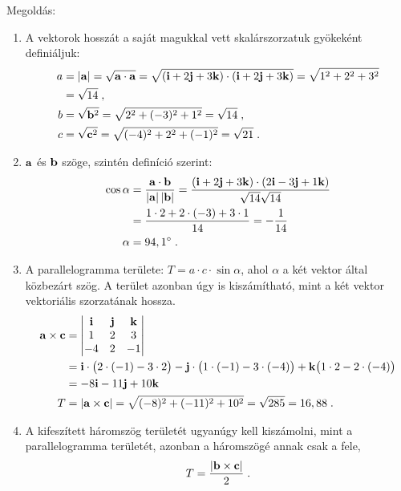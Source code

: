  Megoldás: 
 \begin{enumerate}[label=\alph*)]
  \item 
   A vektorok hosszát a saját magukkal vett skalárszorzatuk gyökeként definiáljuk:
   \begin{align}
    a
     &=\left\lvert\mathbf{a}\right\rvert
      =\sqrt{\mathbf{a}\cdot\mathbf{a}}
      =\sqrt{(\mathbf{i}+2\mathbf{j}+3\mathbf{k})\cdot(\mathbf{i}+2\mathbf{j}+3\mathbf{k})}
      =\sqrt{1^2+2^2+3^2}\nonumber
    \\
     &=\sqrt{14}\;,
    \\
    b
     &=\sqrt{\mathbf{b}^2}
      =\sqrt{2^2+(-3)^2+1^2}
      =\sqrt{14}\;,
    \\
    c
     &=\sqrt{\mathbf{c}^2}
      =\sqrt{(-4)^2+2^2+(-1)^2}
      =\sqrt{21}\;.
   \end{align}
  
  \item
   $\mathbf{a}$ és $\mathbf{b}$ szöge, szintén definíció szerint:
   \begin{align}
    \cos\alpha
     &=\frac{\mathbf{a}\cdot\mathbf{b}}{\left\lvert\mathbf{a}\right\rvert\left\lvert\mathbf{b}\right\rvert}
      =\frac{(\mathbf{i}+2\mathbf{j}+3\mathbf{k})\cdot(2\mathbf{i}-3\mathbf{j}+1\mathbf{k})}{\sqrt{14}\sqrt{14}}\nonumber
    \\
     &=\frac{1\cdot 2+2\cdot(-3)+3\cdot 1}{14}
      =-\frac{1}{14}\\
    \alpha
     &=94,1^\circ\;.
   \end{align}
   
  \item
   A parallelogramma területe: $T=a\cdot c\cdot \sin\alpha$, ahol $\alpha$ a két vektor által közbezárt szög. A terület azonban úgy is kiszámítható, mint a két vektor vektoriális szorzatának hossza.
   \begin{align}
    \mathbf{a}\times\mathbf{c}
     &=\begin{vmatrix}
        \mathbf{i} & \mathbf{j} & \mathbf{k} \\
        1 & 2 & 3 \\
        -4 & 2 & -1
       \end{vmatrix}\nonumber\\
     &=\mathbf{i}\cdot\big(2\cdot(-1)-3\cdot 2\big)-\mathbf{j}\cdot\big(1\cdot (-1)-3\cdot(-4)\big)+\mathbf{k}\big(1\cdot 2 -2\cdot(-4)\big)
      \nonumber\\
     &=-8\mathbf{i}-11\mathbf{j}+10\mathbf{k}\\
    T
     &=\left\lvert\mathbf{a}\times\mathbf{c}\right\rvert
      =\sqrt{(-8)^2+(-11)^2+10^2}
      =\sqrt{285}
      =16,88\;.
   \end{align}
  
  \item 
    A kifeszített háromszög területét ugyanúgy kell kiszámolni, mint a parallelogramma területét, azonban a háromszögé annak csak a fele,
    \begin{align}
     T=\frac{\left\lvert\mathbf{b}\times\mathbf{c}\right\rvert}{2}\;.
    \end{align}
   

\end{enumerate}

